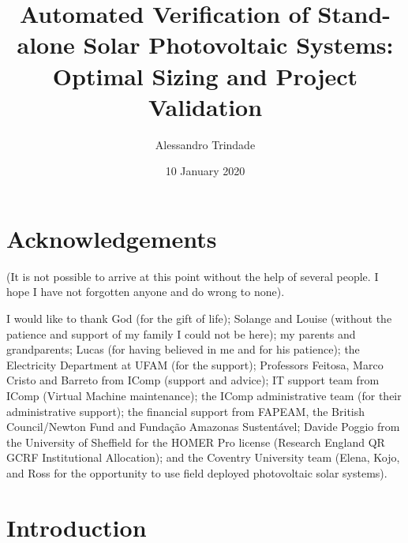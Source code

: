 \documentclass[12pt,twoside]{report}
\title{Automated Verification of Stand-alone Solar Photovoltaic Systems: Optimal Sizing and Project Validation}
\author{Alessandro Trindade}
\date{10 January 2020}
\renewcommand{\headrulewidth}{0.4pt}
\renewcommand{\footrulewidth}{0.4pt}
\begin{document}



\thispagestyle{empty}


\newpage 


\pagestyle{empty}
\newpage



%
%
\chapter*{Acknowledgements}
(It is not possible to arrive at this point without the help of several people. I hope I have not forgotten anyone and do wrong to none).

I would like to thank God (for the gift of life); Solange and Louise (without the patience and support of my family I could not be here); my parents and grandparents; Lucas (for having believed in me and for his patience); the Electricity Department at UFAM (for the support); Professors Feitosa, Marco Cristo and Barreto from IComp (support and advice); IT support team from IComp (Virtual Machine maintenance); the IComp administrative team (for their administrative support); the financial support from FAPEAM, the British Council/Newton Fund and Fundação Amazonas Sustentável; Davide Poggio from the University of Sheffield for the HOMER Pro license (Research England QR GCRF Institutional Allocation); and the Coventry University team (Elena, Kojo, and Ross for the opportunity to use field deployed photovoltaic solar systems).

\pagestyle{empty}

\tableofcontents

\listoffigures

\listoftables
\newpage 


\chapter{Introduction}
\pagestyle{fancy}
\fancyhead{}
\fancyfoot{}
\fancyfoot[LE,RO]{\thepage}
\renewcommand{\headrulewidth}{0.4pt}
\renewcommand{\footrulewidth}{0.4pt}

\end{document}
